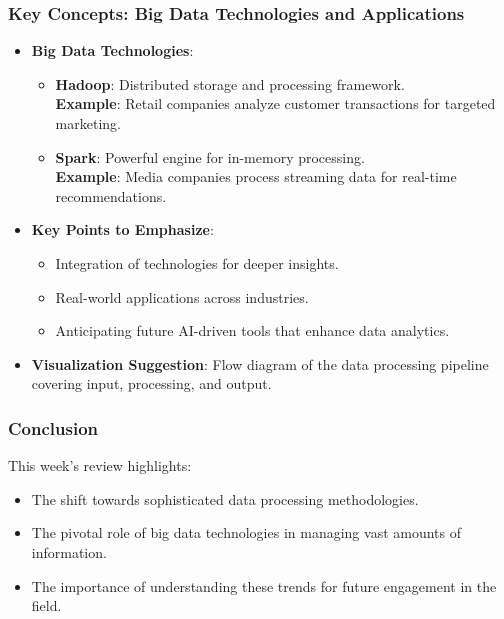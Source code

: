 \documentclass[aspectratio=169]{beamer}
\begin{document}
\begin{frame}[fragile]
    \frametitle{Key Concepts: Big Data Technologies and Applications}
    \begin{itemize}
        \item \textbf{Big Data Technologies}:
        \begin{itemize}
            \item \textbf{Hadoop}: Distributed storage and processing framework.\\
            \textbf{Example}: Retail companies analyze customer transactions for targeted marketing.
            \item \textbf{Spark}: Powerful engine for in-memory processing.\\
            \textbf{Example}: Media companies process streaming data for real-time recommendations.
        \end{itemize}
        
        \item \textbf{Key Points to Emphasize}:
        \begin{itemize}
            \item Integration of technologies for deeper insights.
            \item Real-world applications across industries.
            \item Anticipating future AI-driven tools that enhance data analytics.
        \end{itemize}
        
        \item \textbf{Visualization Suggestion}:
        Flow diagram of the data processing pipeline covering input, processing, and output.
    \end{itemize}
\end{frame}

\begin{frame}[fragile]
    \frametitle{Conclusion}
    This week’s review highlights:
    \begin{itemize}
        \item The shift towards sophisticated data processing methodologies.
        \item The pivotal role of big data technologies in managing vast amounts of information.
        \item The importance of understanding these trends for future engagement in the field.
    \end{itemize}
\end{frame}
\end{document}
